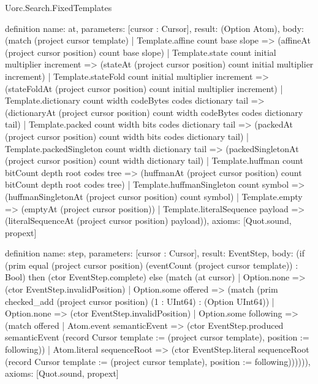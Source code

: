 \begin{lexlean}{Uorc.Search.FixedTemplates}
\begin{semanticmodule}
definition{
  name: at,
  parameters: [cursor : Cursor],
  result: (Option Atom),
  body: (match (project cursor template)
    | Template.affine count base slope => (affineAt (project cursor position) count base slope)
    | Template.state count initial multiplier increment => (stateAt (project cursor position) count initial multiplier increment)
    | Template.stateFold count initial multiplier increment => (stateFoldAt (project cursor position) count initial multiplier increment)
    | Template.dictionary count width codeBytes codes dictionary tail => (dictionaryAt (project cursor position) count width codeBytes codes dictionary tail)
    | Template.packed count width bits codes dictionary tail => (packedAt (project cursor position) count width bits codes dictionary tail)
    | Template.packedSingleton count width dictionary tail => (packedSingletonAt (project cursor position) count width dictionary tail)
    | Template.huffman count bitCount depth root codes tree => (huffmanAt (project cursor position) count bitCount depth root codes tree)
    | Template.huffmanSingleton count symbol => (huffmanSingletonAt (project cursor position) count symbol)
    | Template.empty => (emptyAt (project cursor position))
    | Template.literalSequence payload => (literalSequenceAt (project cursor position) payload)),
  axioms: [Quot.sound, propext]
}

definition{
  name: step,
  parameters: [cursor : Cursor],
  result: EventStep,
  body: (if (prim equal (project cursor position) (eventCount (project cursor template)) : Bool) then (ctor EventStep.complete) else (match (at cursor)
    | Option.none => (ctor EventStep.invalidPosition)
    | Option.some offered => (match (prim checked_add (project cursor position) (1 : UInt64) : (Option UInt64))
      | Option.none => (ctor EventStep.invalidPosition)
      | Option.some following => (match offered
        | Atom.event semanticEvent => (ctor EventStep.produced semanticEvent (record Cursor {template := (project cursor template), position := following}))
        | Atom.literal sequenceRoot => (ctor EventStep.literal sequenceRoot (record Cursor {template := (project cursor template), position := following})))))),
  axioms: [Quot.sound, propext]
}


\end{semanticmodule}
\end{lexlean}
